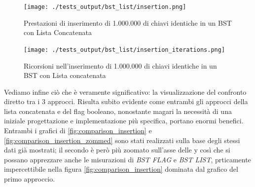 \documentclass{article}
\begin{document}
\begin{figure}[htbp]
 \begin{minipage}{0.5\textwidth}
    \centering
    \texttt{[image: ./tests\_output/bst\_list/insertion.png]}
    \caption{Prestazioni di inserimento di 1.000.000 di chiavi identiche in un BST con Lista Concatenata}
    \label{fig:bst-list-insetion}
  \end{minipage}
      \hspace{0.05\textwidth}
  \begin{minipage}{0.5\textwidth}
    \centering
    \texttt{[image: ./tests\_output/bst\_list/insertion\_iterations.png]}
    \caption{Ricorsioni nell'inserimento di 1.000.000 di chiavi identiche in un BST con Lista concatenata}
    \label{fig:bst-list-insetion-iterations}
  \end{minipage}%
\end{figure}



\begin{minipage}[t]{\linewidth}
\begin{multicols}{2}
\begin{minipage}{\linewidth}
    \centering
    \label{tab:bst-flag-insertion-summarised}
\end{minipage}

\columnbreak

\begin{minipage}{\linewidth}
    \centering
    \label{tab:bst-list-insertion-summarised}
\end{minipage}

\end{multicols}

\end{minipage}

\vspace{10px}

Vediamo infine ciò che è veramente significativo: la visualizzazione del confronto diretto tra i 3 approcci.
Risulta subito evidente come entrambi gli approcci della lista concatenata e del flag booleano, nonostante magari la necessità di una iniziale progettazione e implementazione più specifica, portano enormi benefici. Entrambi i grafici di  {\cref{fig:comparison_insertion}} e {\cref{fig:comparison_insertion_zommed}} sono stati realizzati sulla base degli stessi dati già mostrati; il secondo è però più zoomato sull'asse delle y  così che si possano apprezzare anche le misurazioni di \textit{BST FLAG} e \textit{BST LIST}, prticamente impercettibile nella figura {\cref{fig:comparison_insertion}} dominata dal grafico del primo approccio.
\end{document}
